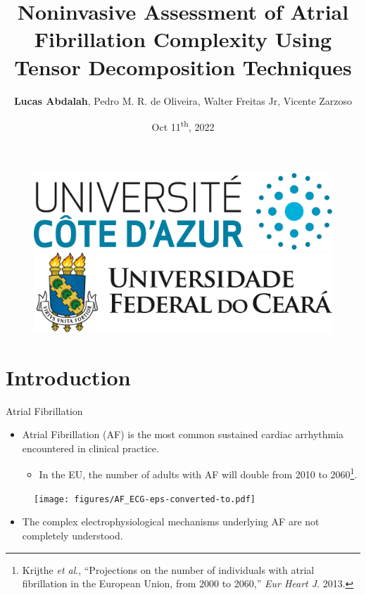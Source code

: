 \documentclass{beamer}
\title[Tensor-Based Signal Processing]{Noninvasive Assessment of Atrial Fibrillation Complexity Using Tensor Decomposition Techniques}
\author[Lucas Abdalah]{\textbf{Lucas Abdalah}, Pedro M. R. de Oliveira, Walter Freitas Jr, Vicente Zarzoso}
\date{Oct 11{\textsuperscript{th}}, 2022}
\begin{document}
	\begin{frame}
		\begin{figure}[!htb]
			\centering
			\includegraphics[scale=0.055]{figures/UCA_logo} 
			\includegraphics[scale=0.130]{figures/UFC_logo.png}
		\end{figure}

		\titlepage
	\end{frame}

\section{Introduction} 
	
	\begin{frame}{Atrial Fibrillation}	
		
		\begin{itemize}
			\item Atrial Fibrillation (AF) is the most common sustained cardiac arrhythmia encountered in clinical practice.
			\begin{itemize}
				\item  In the EU, the number of adults with AF will double from 2010 to 2060\footnote{Krijthe \textit{et al}., ``Projections on the number of individuals with atrial fibrillation in the European Union, from 2000 to 2060,'' \textit{Eur Heart J}. 2013.}.
			\end{itemize}
		\end{itemize}
		\begin{figure}
			\centering
			\texttt{[image: figures/AF\_ECG-eps-converted-to.pdf]}
		\end{figure}
		\vspace{-0.8in}	
		\begin{itemize}
			\item The complex electrophysiological mechanisms underlying AF are not completely understood.
		\end{itemize}
	\end{frame}
\end{document}
